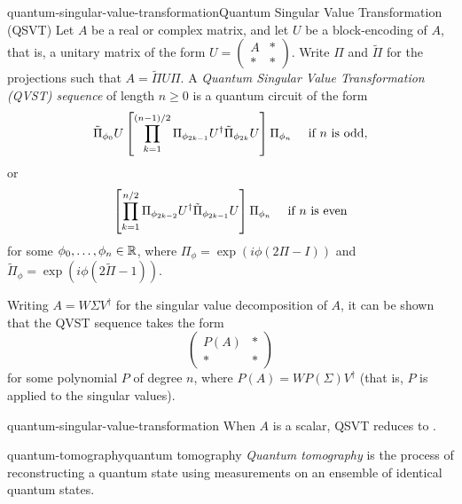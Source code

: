\begin{topic}{quantum-singular-value-transformation}{Quantum Singular Value Transformation (QSVT)}
    Let $A$ be a real or complex matrix, and let $U$ be a block-encoding of $A$, that is, a unitary matrix of the form $U = \begin{pmatrix} A & * \\ * & * \end{pmatrix}$. Write $\Pi$ and $\tilde{\Pi}$ for the projections such that $A = \tilde{\Pi} U \Pi$.
    A \emph{Quantum Singular Value Transformation (QVST) sequence} of length $n \ge 0$ is a quantum circuit of the form
    \[ \tilde{\Pi}_{\phi_0} U \left[ \prod_{k = 1}^{(n - 1) / 2} \Pi_{\phi_{2k - 1}} U^\dagger \tilde{\Pi}_{\phi_{2k}} U \right] \Pi_{\phi_n} \quad \textup{ if $n$ is odd}, \]
    or
    \[ \left[ \prod_{k = 1}^{n / 2} \Pi_{\phi_{2k - 2}} U^\dagger \tilde{\Pi}_{\phi_{2k - 1}} U \right] \Pi_{\phi_n} \quad \textup{ if $n$ is even} \]
    for some $\phi_0, \ldots, \phi_n \in \mathbb{R}$, where $\Pi_\phi = \exp(i \phi (2 \Pi - I))$ and $\tilde{\Pi}_\phi = \exp(i \phi (2 \tilde{\Pi} - 1))$.

    Writing $A = W \Sigma V^\dagger$ for the singular value decomposition of $A$, it can be shown that the QVST sequence takes the form
    \[ \begin{pmatrix} P(A) & * \\ * & * \end{pmatrix} \]
    for some polynomial $P$ of degree $n$, where $P(A) = W P(\Sigma) V^\dagger$ (that is, $P$ is applied to the singular values).
\end{topic}

\begin{example}{quantum-singular-value-transformation}
    When $A$ is a scalar, QSVT reduces to .
\end{example}

\begin{topic}{quantum-tomography}{quantum tomography}
    \emph{Quantum tomography} is the process of reconstructing a quantum state using measurements on an ensemble of identical quantum states.
\end{topic}

